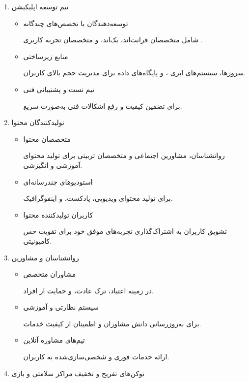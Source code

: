 \documentclass[dvipsnames, svgnames, x11names, 11pt]{article}
\begin{document}
\begin{itemize}
\begin{enumerate}
\item 
تیم توسعه اپلیکیشن  
\begin{itemize}
\item 
توسعه‌دهندگان با تخصص‌های چندگانه

شامل متخصصان فرانت‌اند، بک‌اند، و متخصصان تجربه کاربری .  

\item 
منابع زیرساختی

سرورها، سیستم‌های ابری ، و پایگاه‌های داده برای مدیریت حجم بالای کاربران.  

\item 
تیم تست و پشتیبانی فنی

برای تضمین کیفیت و رفع اشکالات فنی به‌صورت سریع.  
\end{itemize}

\item 
تولیدکنندگان محتوا  

\begin{itemize}
\item 
متخصصان محتوا

روانشناسان، مشاورین اجتماعی و متخصصان تربیتی برای تولید محتوای آموزشی و انگیزشی.  

\item 
استودیوهای چندرسانه‌ای

برای تولید محتوای ویدیویی، پادکست، و اینفوگرافیک.  

\item 
کاربران تولیدکننده محتوا

تشویق کاربران به اشتراک‌گذاری تجربه‌های موفق خود برای تقویت حس کامیونیتی.  
\end{itemize}

\item
روانشناسان و مشاورین  

\begin{itemize}
\item 
مشاوران متخصص

در زمینه اعتیاد، ترک عادت، و حمایت از افراد.  

\item 
سیستم نظارتی و آموزشی

برای به‌روزرسانی دانش مشاوران و اطمینان از کیفیت خدمات.  

\item 
تیم‌های مشاوره آنلاین

ارائه خدمات فوری و شخصی‌سازی‌شده به کاربران.  
\end{itemize}

\item 
توکن‌های تفریح و تخفیف مراکز سلامتی و بازی  


\end{enumerate}
\end{itemize}
\end{document}

